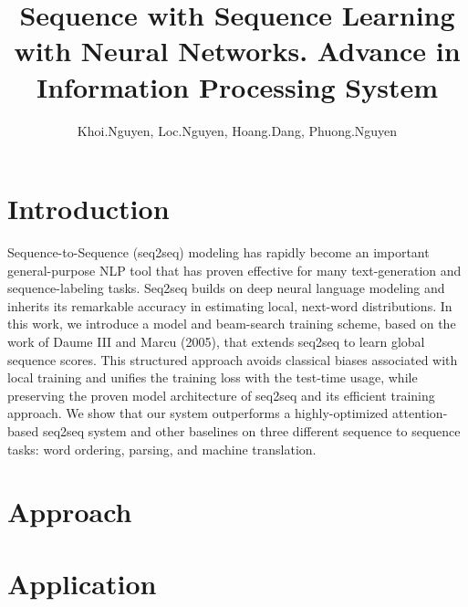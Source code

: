\documentclass{report}
\title{Sequence with Sequence Learning with Neural Networks. Advance in Information Processing System}
\date{}
\author{Khoi.Nguyen, Loc.Nguyen,  Hoang.Dang, Phuong.Nguyen}
\begin{document}
\maketitle
\section{Introduction}

\cite{DBLP:journals/bioinformatics/TsubakiTS19}

Sequence-to-Sequence (seq2seq) modeling has rapidly become an important general-purpose NLP tool that has proven effective for many text-generation and sequence-labeling tasks. Seq2seq builds on deep neural language modeling and inherits its remarkable accuracy in estimating local, next-word distributions. In this work, we introduce a model and beam-search training scheme, based on the work of Daume III and Marcu (2005), that extends seq2seq to learn global sequence scores. This structured approach avoids classical biases associated with local training and unifies the training loss with the test-time usage, while preserving the proven model architecture of seq2seq and its efficient training approach. We show that our system outperforms a highly-optimized attention-based seq2seq system and other baselines on three different sequence to sequence tasks: word ordering, parsing, and machine translation.


\section{Approach}
\cite{DBLP:journals/access/SehovacG20}
\section{Application}


\end{document}
